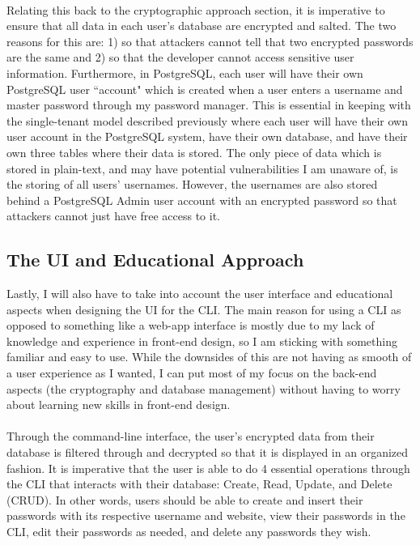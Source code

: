 \documentclass[10pt,twocolumn]{article}
\begin{document}
\paragraph{}
Relating this back to the cryptographic approach section, it is imperative to ensure that all data in each user's database are encrypted and salted. The two reasons for this are: 1) so that attackers cannot tell that two encrypted passwords are the same and 2) so that the developer cannot access sensitive user information. Furthermore, in PostgreSQL, each user will have their own PostgreSQL user ``account" which is created when a user enters a username and master password through my password manager. This is essential in keeping with the single-tenant model described previously where each user will have their own user account in the PostgreSQL system, have their own database, and have their own three tables where their data is stored. The only piece of data which is stored in plain-text, and may have potential vulnerabilities I am unaware of, is the storing of all users' usernames. However, the usernames are also stored behind a PostgreSQL Admin user account with an encrypted password so that attackers cannot just have free access to it.

\subsection{The UI and Educational Approach}
Lastly, I will also have to take into account the user interface and educational aspects when designing the UI for the CLI. The main reason for using a CLI as opposed to something like a web-app interface is mostly due to my lack of knowledge and experience in front-end design, so I am sticking with something familiar and easy to use. While the downsides of this are not having as smooth of a user experience as I wanted, I can put most of my focus on the back-end aspects (the cryptography and database management) without having to worry about learning new skills in front-end design.

\paragraph{}
Through the command-line interface, the user's encrypted data from their database is filtered through and decrypted so that it is displayed in an organized fashion. It is imperative that the user is able to do 4 essential operations through the CLI that interacts with their database: Create, Read, Update, and Delete (CRUD)\cite{Olawanletjoel_2022}. In other words, users should be able to create and insert their passwords with its respective username and website, view their passwords in the CLI, edit their passwords as needed, and delete any passwords they wish.
\end{document}
